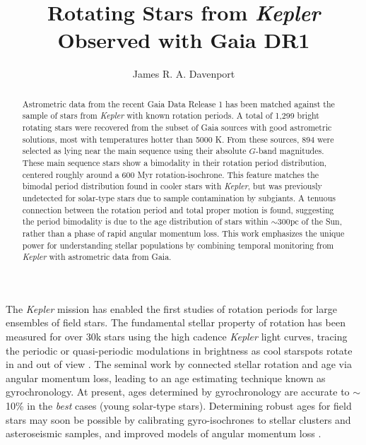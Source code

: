 \documentclass[manuscript, letterpaper]{aastex6}
\makeatletter
\let\origsection\section
\renewcommand\section{\@ifstar{\starsection}{\nostarsection}}
\newcommand\nostarsection[1]{\sectionprelude\origsection{#1}}
\newcommand\starsection[1]{\sectionprelude\origsection*{#1}}
\newcommand\sectionprelude{\vspace{1em}}
\newcommand{\Kepler}{\textsl{Kepler}\xspace}
\makeatother
\begin{document}
\title{Rotating Stars from \Kepler Observed with Gaia DR1}


\author{
	James R. A. Davenport
	}

 

 

\begin{abstract}
Astrometric data from the recent Gaia Data Release 1 has been matched against the sample of stars from \Kepler with known rotation periods. A total of 1,299 bright rotating stars were recovered from the subset of Gaia sources with good astrometric solutions, most with temperatures hotter than 5000 K. From these sources, 894 were selected as lying near the main sequence using their absolute $G$-band magnitudes. These main sequence stars show a bimodality in their rotation period distribution, centered roughly around a 600 Myr rotation-isochrone. This feature matches the bimodal period distribution found in cooler stars with \Kepler, but was previously undetected for solar-type stars due to sample contamination by subgiants.
A tenuous connection between the rotation period and total proper motion is found, suggesting the period bimodality is due to the age distribution of stars within $\sim$300pc of the Sun, rather than a phase of rapid angular momentum loss.
This work emphasizes the unique power for understanding stellar populations by combining temporal monitoring from \Kepler with astrometric data from Gaia.
\end{abstract}



\section{Introduction}

The \Kepler mission \citep{borucki2010} has enabled the first studies of rotation periods for large ensembles of field stars. The fundamental stellar property of rotation has been measured for over 30k stars using the high cadence \Kepler light curves, tracing the periodic or quasi-periodic modulations in brightness as cool starspots rotate in and out of view \citep{reinhold2013,mcquillan2014}. The seminal work by \citet{skumanich1972} connected stellar rotation and age via angular momentum loss, leading to an age estimating technique known as gyrochronology. At present, ages determined by gyrochronology are accurate to $\sim$10\% in the {\it best} cases (young solar-type stars). Determining robust ages for field stars may soon be possible by calibrating gyro-isochrones to stellar clusters and asteroseismic samples, and improved models of angular momentum loss \citep[e.g.][]{angus2015,van-saders2016}. 
\end{document}
